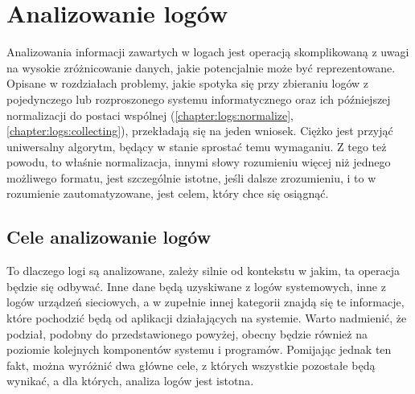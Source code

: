 \section{Analizowanie logów}
\label{chapter:logs:analysis}

Analizowania informacji zawartych w logach jest operacją skomplikowaną z uwagi na wysokie zróżnicowanie danych, jakie
potencjalnie może być reprezentowane. Opisane w rozdziałach problemy, jakie spotyka się
przy zbieraniu logów z pojedynczego lub rozproszonego systemu informatycznego oraz ich 
późniejszej normalizacji do postaci wspólnej (\ref{chapter:logs:normalize}, \ref{chapter:logs:collecting}), 
przekładają się na jeden wniosek. Ciężko jest przyjąć uniwersalny algorytm, będący w stanie sprostać temu wymaganiu.
Z tego też powodu, to właśnie normalizacja, innymi słowy rozumieniu więcej niż jednego możliwego formatu, jest
szczególnie istotne, jeśli dalsze zrozumieniu, i to w rozumienie zautomatyzowane, jest celem, który chce się 
osiągnąć.

    \subsection{Cele analizowanie logów}
    
    To dlaczego logi są analizowane, zależy silnie od kontekstu w jakim, ta operacja będzie się odbywać. 
    Inne dane będą uzyskiwane z logów systemowych, inne z logów urządzeń sieciowych, a w zupełnie innej
    kategorii znajdą się te informacje, które pochodzić będą od aplikacji działających na systemie. Warto
    nadmienić, że podział, podobny do przedstawionego powyżej, obecny będzie również na poziomie
    kolejnych komponentów systemu i programów. Pomijając jednak ten fakt, 
    można wyróżnić dwa główne cele, z których wszystkie pozostałe będą wynikać,
    a dla których, analiza logów jest istotna.
    
